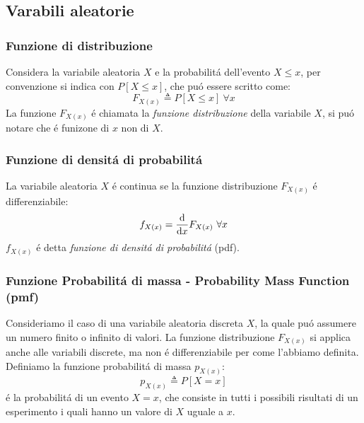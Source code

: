     \subsection{Varabili aleatorie}
        \subsubsection{Funzione di distribuzione}
            Considera la variabile aleatoria $X$ e la probabilitá dell'evento $X\leq x$, per convenzione si indica con $P[X\leq x]$,
            che puó essere scritto come:
            \[
                F_{X(x)} \triangleq P[X\leq x]\ \forall x    
            \]
            La funzione $F_{X(x)}$ é chiamata la \emph{funzione distribuzione} della variabile $X$, si puó notare che é funizone di $x$ non di 
            $X$.
        \subsubsection{Funzione di densitá di probabilitá}
            La variabile aleatoria $X$ é continua se la funzione distribuzione $F_{X(x)}$ é differenziabile:
            \[
                f_{X(x)} = \derivative{}{x}F_{X(x)}\ \forall x    
            \]
            $f_{X(x)}$ é detta \emph{funzione di densitá di probabilitá} (pdf).
        \subsubsection{Funzione Probabilitá di massa - Probability Mass Function (pmf)}
            Consideriamo il caso di una variabile aleatoria discreta $X$, la quale puó assumere un numero finito o infinito di valori. La funzione 
            distribuzione $F_{X(x)}$ si applica anche alle variabili discrete, ma non é differenziabile per come l'abbiamo definita. Definiamo 
            la funzione probabilitá di massa $p_{X(x)}$:
            \[
                p_{X(x)} \triangleq P[X = x]    
            \]
            é la probabilitá di un evento $X=x$, che consiste in tutti i possibili risultati di un esperimento i quali hanno un valore di 
            $X$ uguale a $x$.
